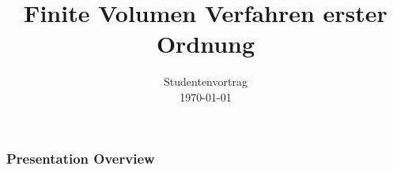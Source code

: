 \documentclass[
	11pt, %
	aspectratio=169, %
]{beamer}
\title[FV 1. O.]{Finite Volumen Verfahren erster Ordnung} %
\author[Jannik Schrempp\and Hendrik Klemm]{}%
\institute[]{University of Stuttgart IAG} %
\date[\myformat\today]{Studentenvortrag \\ \myformat\today} %
\begin{document}
\newcommand\barbelow[1]{\stackunder[1.2pt]{$#1$}{\rule{.8ex}{.075ex}}}

\begin{frame}
		
	\titlepage %

\end{frame}



\begin{frame}
	\frametitle{Presentation Overview} %
	
	\tableofcontents %
\end{frame}

\end{document}
